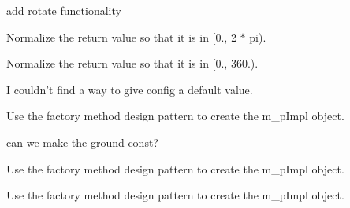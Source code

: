 \begin{DoxyRefList}
\item[\label{todo__todo000105}%
\hypertarget{todo__todo000105}{}%
Member \hyperlink{classtg_structure_aaab3aeae354efdb63ab40acdb7bf3553}{tg\-Structure\-:\-:add\-Rotation} (const bt\-Vector3 \&fixed\-Point, const bt\-Vector3 \&axis, double angle)]add rotate functionality  
\item[\label{todo__todo000114}%
\hypertarget{todo__todo000114}{}%
Member \hyperlink{classtg_util_a84689e1db28a5d63f157e628e137415c}{tg\-Util\-:\-:deg2rad} (double degrees)]Normalize the return value so that it is in \mbox{[}0., 2 $\ast$ pi).  
\item[\label{todo__todo000113}%
\hypertarget{todo__todo000113}{}%
Member \hyperlink{classtg_util_ad4c52698d54e566e5b8f5d87677bd92a}{tg\-Util\-:\-:rad2deg} (double radians)]Normalize the return value so that it is in \mbox{[}0., 360.).  
\item[\label{todo__todo000028}%
\hypertarget{todo__todo000028}{}%
Member \hyperlink{classtg_world_aaf344a85c8ae0b3b90b201b37c8a2a57}{tg\-World\-:\-:tg\-World} (const Config \&config)]I couldn't find a way to give config a default value. 

Use the factory method design pattern to create the m\-\_\-p\-Impl object.  
\item[\label{todo__todo000029}%
\hypertarget{todo__todo000029}{}%
Member \hyperlink{classtg_world_a015dcc7c703a957e5ec15b64364f5991}{tg\-World\-:\-:tg\-World} (const Config \&config, \hyperlink{classtg_ground}{tg\-Ground} $\ast$ground)]can we make the ground const? 

Use the factory method design pattern to create the m\-\_\-p\-Impl object.  
\item[\label{todo__todo000025}%
\hypertarget{todo__todo000025}{}%
Member \hyperlink{classtg_world_af71f7c0c5516173079cb3c7e8b28e015}{tg\-World\-:\-:tg\-World} ()]Use the factory method design pattern to create the m\-\_\-p\-Impl object. 
\end{DoxyRefList}